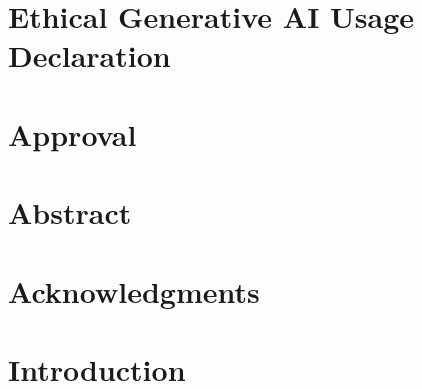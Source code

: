 \documentclass[12pt]{report}
\begin{document}
\chapter*{Ethical Generative AI Usage Declaration}
\label{pre:01b-AI-declaration}


\chapter*{Approval}
\label{pre:02-approval}


\chapter*{Abstract}
\label{pre:03-abstract}








\chapter*{Acknowledgments}
\label{pre:06-acknowledgments}




\chapter{Introduction}
\label{ch:chapter-01}
 \renewcommand{\arraystretch}{1}  

\end{document}
